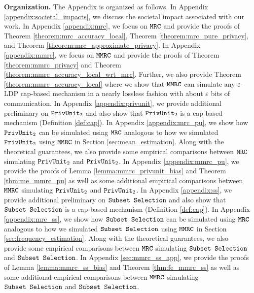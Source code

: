 \textbf{Organization.}
The Appendix is organized as follows. In Appendix \ref{appendix:societal_impacts}, we discuss the societal impact associated with our work. In Appendix \ref{appendix:mrc}, we focus on $\texttt{MRC}$ and provide the proofs of Theorem \ref{theorem:mrc_accuracy_local}, Theorem \ref{theorem:mrc_pure_privacy}, and Theorem \ref{theorem:mrc_approximate_privacy}. In Appendix \ref{appendix:mmrc}, we focus on $\texttt{MMRC}$ and provide the proofs of Theorem \ref{theorem:mmrc_privacy} and Theorem \ref{theorem:mmrc_accuracy_local_wrt_mrc}. Further, we also provide Theorem \ref{theorem:mmrc_accuracy_local} where we show that $\texttt{MMRC}$ can simulate any $\varepsilon$-LDP cap-based mechanism in a nearly lossless fashion with about $\varepsilon$ bits of communication. In Appendix \ref{appendix:privunit}, we provide additional preliminary on $\texttt{PrivUnit}_2$ and also show that $\texttt{PrivUnit}_2$ is a cap-based mechanism (Definition \ref{def:cap}). In Appendix \ref{appendix:mrc_pu}, we show how $\texttt{PrivUnit}_2$ can be simulated using $\texttt{MRC}$ analogous to how we simulated $\texttt{PrivUnit}_2$ using $\texttt{MMRC}$ in Section \ref{sec:mean_estimation}. Along with the theoretical guarantees, we also provide some empirical comparisons between $\texttt{MRC}$ simulating $\texttt{PrivUnit}_2$ and $\texttt{PrivUnit}_2$. In Appendix \ref{appendix:mmrc_pu}, we provide the proofs of Lemma \ref{lemma:mmrc_privunit_bias} and Theorem \ref{thm:me_mmrc_pu} as well as some additional empirical comparisons between $\texttt{MMRC}$ simulating $\texttt{PrivUnit}_2$ and $\texttt{PrivUnit}_2$.
In Appendix \ref{appendix:ss}, we provide additional preliminary on $\texttt{Subset Selection}$ and also show that $\texttt{Subset Selection}$ is a cap-based mechanism (Definition \ref{def:cap}). 
In Appendix \ref{appendix:mrc_ss}, we show how $\texttt{Subset Selection}$ can be simulated using $\texttt{MRC}$ analogous to how we simulated $\texttt{Subset Selection}$ using $\texttt{MMRC}$ in Section \ref{sec:frequency_estimation}. Along with the theoretical guarantees, we also provide some empirical comparisons between $\texttt{MRC}$ simulating $\texttt{Subset Selection}$ and $\texttt{Subset Selection}$. 
In Appendix \ref{sec:mmrc_ss_app}, we provide the proofs of Lemma \ref{lemma:mmrc_ss_bias} and Theorem \ref{thm:fe_mmrc_ss} as well as some additional empirical comparisons between $\texttt{MMRC}$ simulating $\texttt{Subset Selection}$ and $\texttt{Subset Selection}$.














